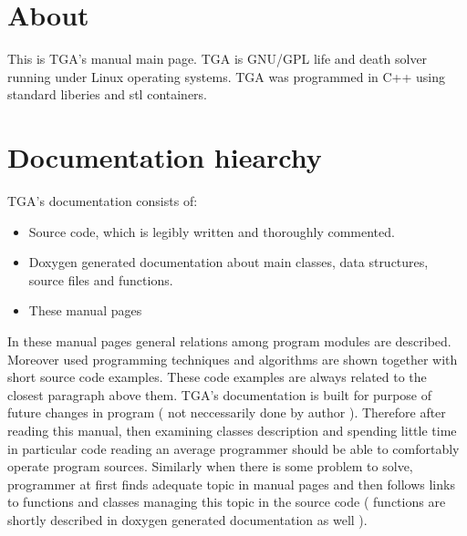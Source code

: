 \section{About}\label{index_About}
This is TGA's manual main page. TGA is GNU/GPL life and death solver running under Linux operating systems. TGA was programmed in C++ using standard liberies and stl containers. \section{Documentation hiearchy}\label{index_mainpage__sec_1}
TGA's documentation consists of:\begin{itemize}
\item Source code, which is legibly written and thoroughly commented.\item Doxygen generated documentation about main classes, data structures, source files and functions.\item These manual pages\end{itemize}


In these manual pages general relations among program modules are described. Moreover used programming techniques and algorithms are shown together with short source code examples. These code examples are always related to the closest paragraph above them. TGA's documentation is built for purpose of future changes in program ( not neccessarily done by author ). Therefore after reading this manual, then examining classes description and spending little time in particular code reading an average programmer should be able to comfortably operate program sources. Similarly when there is some problem to solve, programmer at first finds adequate topic in manual pages and then follows links to functions and classes managing this topic in the source code ( functions are shortly described in doxygen generated documentation as well ).

